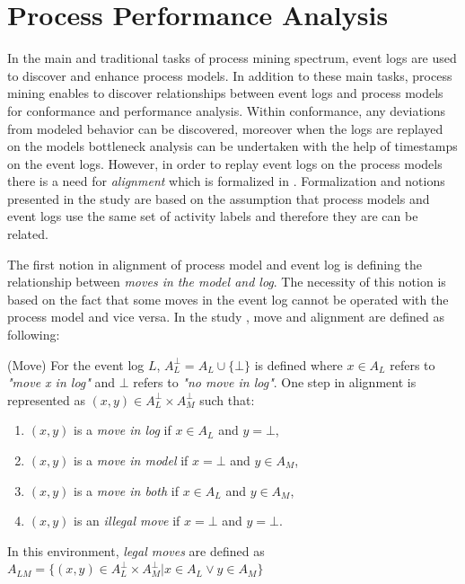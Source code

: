 \section{Process Performance Analysis}
\label{sec:process-performance-analysis}
In the main and traditional tasks of process mining spectrum, event logs are used to discover and enhance process models. In addition to these main tasks, process mining enables to discover relationships between event logs and process models for conformance and performance analysis. Within conformance, any deviations from modeled behavior can be discovered, moreover when the logs are replayed on the models bottleneck analysis can be undertaken with the help of timestamps on the event logs. However, in order to replay event logs on the process models there is a need for \textit{alignment} which is formalized in \cite{van2012replaying}. Formalization and notions presented in the study \cite{van2012replaying} are based on the assumption that process models and event logs use the same set of activity labels and therefore they are can be related.

The first notion in alignment of process model and event log is defining the relationship between \textit{moves in the model and log}. The necessity of this notion is based on the fact that some moves in the event log cannot be operated with the process model and vice versa. In the study \cite{van2012replaying}, move and alignment are defined as following:

\theoremstyle{definition}
\begin{definition}{}
(Move) For the event log $L$, $A_{L}^{\bot} = A_{L} \cup \{ \bot\}$ is defined where $x \in A_{L}$ refers to \textit{"move x in log"} and $\bot$ refers to \textit{"no move in log"}. One step in alignment is represented as $(x,y) \in A_{L}^{\bot} \times A_{M}^{\bot}$ such that:
\begin{enumerate}
  \item $(x,y)$ is a \textit{move in log} if $ x \in A_{L}$ and $y=\bot$,
  \item $(x,y)$ is a \textit{move in model} if $x=\bot$ and $y \in A_{M}$,
  \item $(x,y)$ is a \textit{move in both} if $x \in A_{L}$ and $y \in A_{M}$,
  \item $(x,y)$ is an \textit{illegal move} if $x=\bot$ and $y=\bot$.
\end{enumerate}
In this environment, \textit{legal moves} are defined as $A_{LM} = \{ (x,y) \in A_{L}^{\bot} \times A_{M}^{\bot} |  x \in A_{L} \vee y \in A_{M} \}$
\end{definition}

